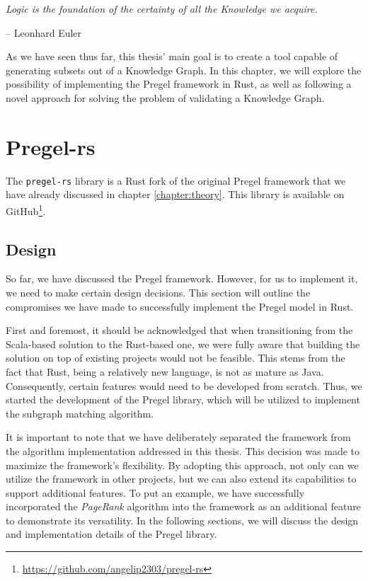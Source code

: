 \epigraph{\textit{Logic is the foundation of the certainty of all the Knowledge we acquire.}}{-- \textup{Leonhard Euler}}

As we have seen thus far, this thesis' main goal is to create a tool capable of generating subsets out of a Knowledge Graph. In this chapter, we will explore the possibility of implementing the Pregel framework in Rust, as well as following a novel approach for solving the problem of validating a Knowledge Graph.

\section{Pregel-rs}

The \texttt{pregel-rs} library is a Rust fork of the original Pregel framework that we have already discussed in chapter \ref{chapter:theory}. This library is available on GitHub\footnote{\url{https://github.com/angelip2303/pregel-rs}}.

\subsection{Design}

So far, we have discussed the Pregel framework. However, for us to implement it, we need to make certain design decisions. This section will outline the compromises we have made to successfully implement the Pregel model in Rust.

First and foremost, it should be acknowledged that when transitioning from the Scala-based solution to the Rust-based one, we were fully aware that building the solution on top of existing projects would not be feasible. This stems from the fact that Rust, being a relatively new language, is not as mature as Java. Consequently, certain features would need to be developed from scratch. Thus, we started the development of the Pregel library, which will be utilized to implement the subgraph matching algorithm.

It is important to note that we have deliberately separated the framework from the algorithm implementation addressed in this thesis. This decision was made to maximize the framework's flexibility. By adopting this approach, not only can we utilize the framework in other projects, but we can also extend its capabilities to support additional features. To put an example, we have successfully incorporated the \textit{PageRank} algorithm into the framework as an additional feature to demonstrate its versatility. In the following sections, we will discuss the design and implementation details of the Pregel library.

